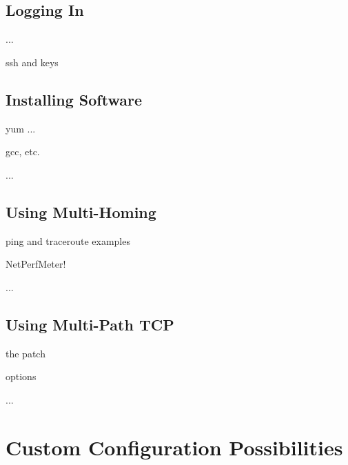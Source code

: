 \section{Logging In}
\label{sec:Logging-In}

...

ssh and keys



\section{Installing Software}
\label{sec:Installing-Software}

yum ...

gcc, etc.

...


\section{Using Multi-Homing}
\label{sec:Using-Multi-Homing}

ping and traceroute examples

NetPerfMeter!

...


\section{Using Multi-Path TCP}
\label{sec:Using-Multi-Path-TCP}

the patch

options

...



\chapter{Custom Configuration Possibilities}
\label{cha:Custom-Configuration-Possibilities}

